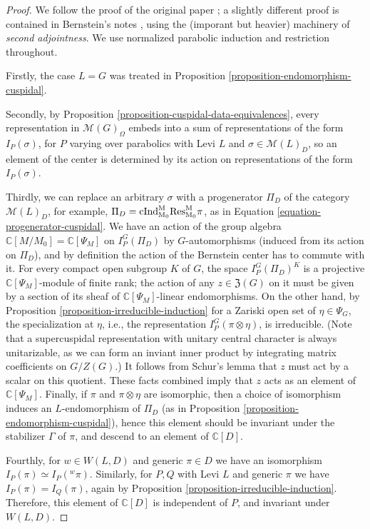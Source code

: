 \begin{proof}
We follow the proof of the original paper \cite{Bernstein-centre}; a slightly different proof is contained in Bernstein's notes \cite{Bernstein-padic}, using the (imporant but heavier) machinery of {\it second adjointness}. We use normalized parabolic induction and restriction throughout. 

Firstly, the case $L=G$ was treated in Proposition \ref{proposition-endomorphism-cuspidal}.

Secondly, by Proposition \ref{proposition-cuspidal-data-equivalences}, every representation in $\mathcal M(G)_\Omega$ embeds into a sum of representations of the form $I_P(\sigma)$, for $P$ varying over parabolics with Levi $L$ and $\sigma\in \mathcal M(L)_D$, so an element of the center is determined by its action on representations of the form $I_P(\sigma)$. 

Thirdly, we can replace an arbitrary $\sigma$ with a progenerator $\Pi_D$ of the category $\mathcal M(L)_D$, for example, $	\Pi_D= \rm{cInd}_{M_0}^M \rm{Res}_{M_0}^M \pi$, as in Equation \ref{equation-progenerator-cuspidal}. We have an action of the group algebra $\mathbb C[M/M_0]=\mathbb C[\Psi_M]$ on $I_P^G(\Pi_D)$ by $G$-automorphisms (induced from its action on $\Pi_D$), and by definition the action of the Bernstein center has to commute with it. For every compact open subgroup $K$ of $G$, the space $I_P^G(\Pi_D)^K$ is a projective $\mathbb C[\Psi_M]$-module of finite rank; the action of any $z\in \mathfrak Z(G)$ on it must be given by a section of its sheaf of $\mathbb C[\Psi_M]$-linear endomorphisms. On the other hand, by Proposition \ref{proposition-irreducible-induction} for a Zariski open set of $\eta\in\Psi_G$, the specialization at $\eta$, i.e., the representation $I_P^G(\pi\otimes\eta)$, is irreducible. (Note that a supercuspidal representation with unitary central character is always unitarizable, as we can form an inviant inner product by integrating matrix coefficients on $G/Z(G)$.) It follows from Schur's lemma that $z$ must act by a scalar on this quotient. These facts combined imply that $z$ acts as an element of $\mathbb C[\Psi_M]$. Finally, if $\pi$ and $\pi\otimes\eta$ are isomorphic, then a choice of isomorphism induces an $L$-endomorphism of $\Pi_D$ (as in Proposition \ref{proposition-endomorphism-cuspidal}), hence this element should be invariant under the stabilizer $\Gamma$ of $\pi$, and descend to an element of $\mathbb C[D]$.

Fourthly, for $w\in W(L,D)$ and generic $\pi\in D$ we have an isomorphism $I_P(\pi)\simeq I_P({^w\pi})$. Similarly, for $P,Q$ with Levi $L$ and generic $\pi$ we have $I_P(\pi)=I_Q(\pi)$, again by Proposition \ref{proposition-irreducible-induction}. Therefore, this element of $\mathbb C[D]$ is independent of $P$, and invariant under $W(L,D)$. 


\end{proof}
